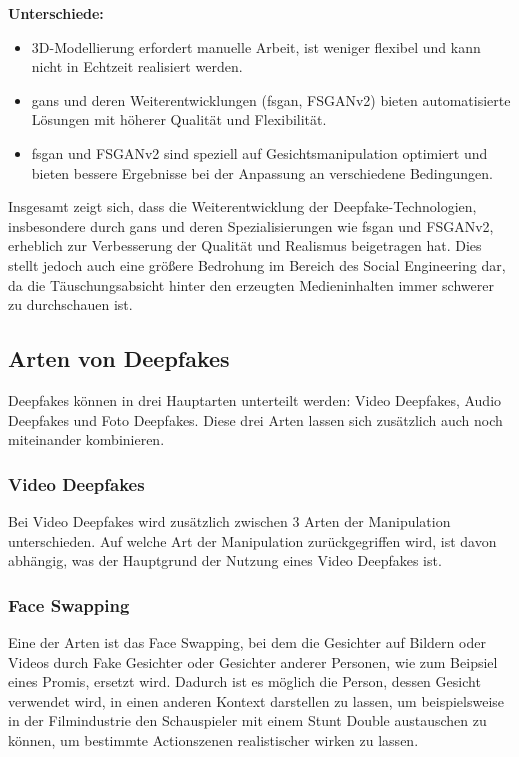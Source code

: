 \textbf{Unterschiede:}
\begin{itemize}
    \item 3D-Modellierung erfordert manuelle Arbeit, ist weniger flexibel und kann nicht in Echtzeit realisiert werden.
    \item \glspl{gan} und deren Weiterentwicklungen (\gls{fsgan}, FSGANv2) bieten automatisierte Lösungen mit höherer Qualität und Flexibilität.
    \item \gls{fsgan} und FSGANv2 sind speziell auf Gesichtsmanipulation optimiert und bieten bessere Ergebnisse bei der Anpassung an verschiedene Bedingungen\cite{Deepfakes-a-survey-and-introduction-to-the-topical-collection}.
\end{itemize}

Insgesamt zeigt sich, dass die Weiterentwicklung der Deepfake-Technologien, insbesondere durch \glspl{gan} und deren Spezialisierungen wie \gls{fsgan} und FSGANv2, erheblich zur Verbesserung der Qualität und Realismus beigetragen hat.
Dies stellt jedoch auch eine größere Bedrohung im Bereich des Social Engineering dar, da die Täuschungsabsicht hinter den erzeugten Medieninhalten immer schwerer zu durchschauen ist.

\subsection{Arten von Deepfakes}
Deepfakes können in drei Hauptarten unterteilt werden: Video Deepfakes, Audio Deepfakes und Foto Deepfakes. Diese drei Arten lassen sich zusätzlich auch noch miteinander kombinieren.\cite{ResearchGate}\newline
\subsubsection*{Video Deepfakes}
Bei Video Deepfakes wird zusätzlich zwischen 3 Arten der Manipulation unterschieden. Auf welche Art der Manipulation zurückgegriffen wird, ist davon abhängig, was der Hauptgrund der Nutzung eines Video Deepfakes ist.\cite{ResearchGate}

\subsubsection*{Face Swapping}
Eine der Arten ist das Face Swapping, bei dem die Gesichter auf Bildern oder Videos durch Fake Gesichter oder Gesichter anderer Personen, wie zum Beipsiel eines Promis, ersetzt wird.
Dadurch ist es möglich die Person, dessen Gesicht verwendet wird, in einen anderen Kontext darstellen zu lassen, um beispielsweise in der Filmindustrie den Schauspieler mit einem Stunt Double austauschen zu können, um bestimmte Actionszenen realistischer wirken zu lassen.\cite{ResearchGate}


